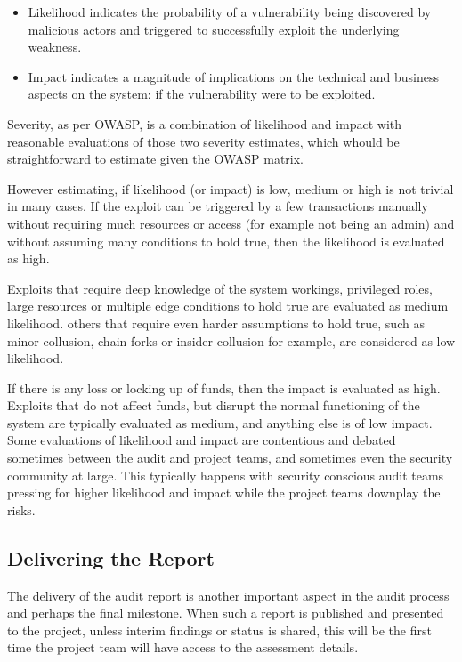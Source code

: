\begin{itemize}
\item
  Likelihood indicates the probability of a vulnerability being
  discovered by malicious actors and triggered to successfully exploit
  the underlying weakness.
\item
  Impact indicates a magnitude of implications on the technical and
  business aspects on the system: if the vulnerability were to be
  exploited.
\end{itemize}

Severity, as per OWASP, is a combination of likelihood and impact with
reasonable evaluations of those two severity estimates, which whould be
straightforward to estimate given the OWASP matrix.

However estimating, if likelihood (or impact) is low, medium or high is
not trivial in many cases. If the exploit can be triggered by a few
transactions manually without requiring much resources or access (for
example not being an admin) and without assuming many conditions to hold
true, then the likelihood is evaluated as high.

Exploits that require deep knowledge of the system workings, privileged
roles, large resources or multiple edge conditions to hold true are
evaluated as medium likelihood. others that require even harder
assumptions to hold true, such as minor collusion, chain forks or
insider collusion for example, are considered as low likelihood.

If there is any loss or locking up of funds, then the impact is
evaluated as high. Exploits that do not affect funds, but disrupt the
normal functioning of the system are typically evaluated as medium, and
anything else is of low impact. Some evaluations of likelihood and
impact are contentious and debated sometimes between the audit and
project teams, and sometimes even the security community at large. This
typically happens with security conscious audit teams pressing for
higher likelihood and impact while the project teams downplay the risks.

\subsection{Delivering the Report}\label{delivering-the-report}

The delivery of the audit report is another important aspect in the
audit process and perhaps the final milestone. When such a report is
published and presented to the project, unless interim findings or
status is shared, this will be the first time the project team will have
access to the assessment details.

